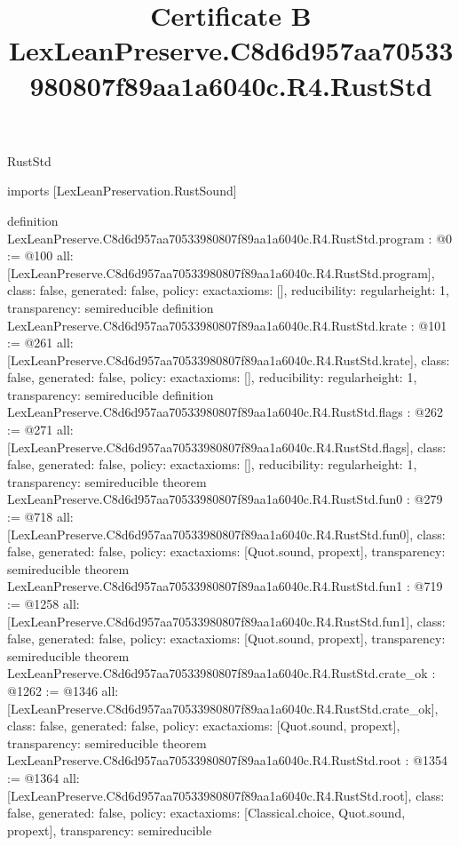 \begin{lexlean}{RustStd}
\title{Certificate B LexLeanPreserve.C8d6d957aa70533980807f89aa1a6040c.R4.RustStd}
\begin{coremodule}
imports [LexLeanPreservation.RustSound]

definition LexLeanPreserve.C8d6d957aa70533980807f89aa1a6040c.R4.RustStd.program : @0 := @100 {
  all: [LexLeanPreserve.C8d6d957aa70533980807f89aa1a6040c.R4.RustStd.program],
  class: false,
  generated: false,
  policy: exact{axioms: []},
  reducibility: regular{height: 1},
  transparency: semireducible
}
definition LexLeanPreserve.C8d6d957aa70533980807f89aa1a6040c.R4.RustStd.krate : @101 := @261 {
  all: [LexLeanPreserve.C8d6d957aa70533980807f89aa1a6040c.R4.RustStd.krate],
  class: false,
  generated: false,
  policy: exact{axioms: []},
  reducibility: regular{height: 1},
  transparency: semireducible
}
definition LexLeanPreserve.C8d6d957aa70533980807f89aa1a6040c.R4.RustStd.flags : @262 := @271 {
  all: [LexLeanPreserve.C8d6d957aa70533980807f89aa1a6040c.R4.RustStd.flags],
  class: false,
  generated: false,
  policy: exact{axioms: []},
  reducibility: regular{height: 1},
  transparency: semireducible
}
theorem LexLeanPreserve.C8d6d957aa70533980807f89aa1a6040c.R4.RustStd.fun0 : @279 := @718 {
  all: [LexLeanPreserve.C8d6d957aa70533980807f89aa1a6040c.R4.RustStd.fun0],
  class: false,
  generated: false,
  policy: exact{axioms: [Quot.sound, propext]},
  transparency: semireducible
}
theorem LexLeanPreserve.C8d6d957aa70533980807f89aa1a6040c.R4.RustStd.fun1 : @719 := @1258 {
  all: [LexLeanPreserve.C8d6d957aa70533980807f89aa1a6040c.R4.RustStd.fun1],
  class: false,
  generated: false,
  policy: exact{axioms: [Quot.sound, propext]},
  transparency: semireducible
}
theorem LexLeanPreserve.C8d6d957aa70533980807f89aa1a6040c.R4.RustStd.crate_ok : @1262 := @1346 {
  all: [LexLeanPreserve.C8d6d957aa70533980807f89aa1a6040c.R4.RustStd.crate_ok],
  class: false,
  generated: false,
  policy: exact{axioms: [Quot.sound, propext]},
  transparency: semireducible
}
theorem LexLeanPreserve.C8d6d957aa70533980807f89aa1a6040c.R4.RustStd.root : @1354 := @1364 {
  all: [LexLeanPreserve.C8d6d957aa70533980807f89aa1a6040c.R4.RustStd.root],
  class: false,
  generated: false,
  policy: exact{axioms: [Classical.choice, Quot.sound, propext]},
  transparency: semireducible
}


\end{coremodule}
\end{lexlean}
